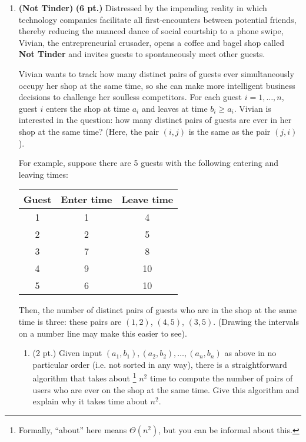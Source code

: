 \documentclass{article}
\begin{document}
\begin{enumerate}
  \item \textbf{(Not Tinder)} \textbf{(6 pt.)} Distressed by the impending
    reality in which technology companies facilitate all first-encounters between
    potential friends, thereby reducing the nuanced dance of social courtship to a 
    phone swipe, Vivian, the entrepreneurial crusader, opens a coffee and bagel
    shop called \textbf{Not Tinder} and invites guests to spontaneously meet other 
    guests.

    Vivian wants to track how many distinct pairs of guests ever simultaneously
    occupy her shop at the same time, so she can make more intelligent business 
    decisions to challenge her soulless competitors. For each guest
    $i = 1, \ldots, n$, guest $i$ enters the shop at time $a_i$ and leaves at time
    $b_i \geq a_i$. Vivian is interested in the question: how many distinct pairs
    of guests are ever in her shop at the same time?  (Here, the pair $(i, j)$ is
    the same as the pair $(j, i)$).

    For example, suppose there are 5 guests with the following entering and
    leaving times:

    \begin{center}
      \begin{tabular}{c|c|c}
        Guest & Enter time & Leave time \\
        \hline
        1 & 1 & 4 \\
        2 & 2 & 5 \\
        3 & 7 & 8 \\
        4 & 9 & 10 \\
        5 & 6 & 10
      \end{tabular}
    \end{center}

    Then, the number of distinct pairs of guests who are in the shop at the same
    time is three: these pairs are $(1, 2)$, $(4, 5)$, $(3, 5)$. (Drawing the
    intervals on a number line may make this easier to see).

    \begin{enumerate}
      \item (2 pt.) Given input $(a_1, b_1), (a_2, b_2), \ldots, (a_n, b_n)$ as
        above in no particular order (i.e. not sorted in any way), there is a
        straightforward algorithm that takes about \footnote{Formally, ``about'' 
        here means $\Theta(n^2)$, but you can be informal about this.} $n^2$ time
        to compute the number of pairs of users who are ever on the shop at the 
        same time. Give this algorithm and explain why it takes time about $n^2$.


\end{enumerate}
\end{enumerate}
\end{document}
